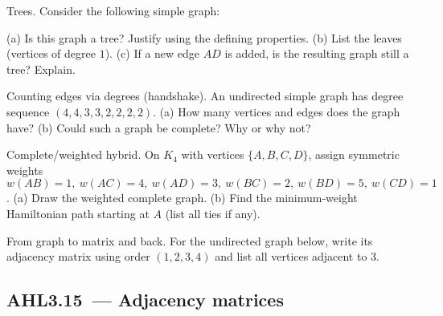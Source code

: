 \documentclass[11pt]{article}
\def\textbf#1{#1}%
\newcommand{\tocsubsection}[1]{\subsection{#1}}
\newcounter{question}
\begin{document}
\begin{question}
\textbf{Trees.}
Consider the following simple graph:
\begin{center}
\end{center}
(a) Is this graph a tree? Justify using the defining properties.  
(b) List the leaves (vertices of degree $1$).  
(c) If a new edge $AD$ is added, is the resulting graph still a tree? Explain.
\end{question}

\begin{question}
\textbf{Counting edges via degrees (handshake).}
An undirected simple graph has degree sequence $(4,4,3,3,2,2,2,2)$.  
(a) How many vertices and edges does the graph have?  
(b) Could such a graph be complete? Why or why not?
\end{question}

\begin{question}
\textbf{Complete/weighted hybrid.}
On $K_4$ with vertices $\{A,B,C,D\}$, assign symmetric weights  
$w(AB)=1,\ w(AC)=4,\ w(AD)=3,\ w(BC)=2,\ w(BD)=5,\ w(CD)=1$.  
(a) Draw the weighted complete graph.  
(b) Find the minimum‐weight Hamiltonian path starting at $A$ (list all ties if any).
\end{question}

\begin{question}
\textbf{From graph to matrix and back.}
For the undirected graph below, write its adjacency matrix using order $(1,2,3,4)$ and list all vertices adjacent to $3$.
\begin{center}
\end{center}
\end{question}

\tocsubsection{AHL3.15 — Adjacency matrices}

\end{document}
